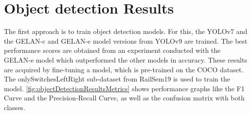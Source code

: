 \section{Object detection Results}
\label{sec:objectDetectionResults}

The first approach is to train object detection models.
For this, the \ac{YOLO}v7 and the \ac{GELAN}-c and \ac{GELAN}-e model versions from \ac{YOLO}v9 are trained.
The best performance scores are obtained from an experiment conducted with the \ac{GELAN}-e model which outperformed the other models in accuracy.
These results are acquired by fine-tuning a model, which is pre-trained on the COCO dataset.
The onlySwitchesLeftRight sub-dataset from RailSem19 is used to train the model.
\autoref{fig:objectDetectionResultsMetrics} shows performance graphs like the F1 Curve and the Precision-Recall Curve, as well as the confusion matrix with both classes.

